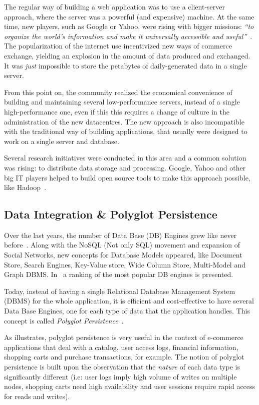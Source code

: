\documentclass{article}
\begin{document}
The regular way of building a web application was to use a client-server approach, where the server was a powerful (and expensive) machine. 
At the same time, new players, such as Google or Yahoo, were rising with bigger missions: \textit{``to organize the world's information and make it universally accessible and useful''}~\cite{Spector:2012:GHA:2209249.2209262}. 
The popularization of the internet use incentivized new ways of commerce exchange, yielding an explosion in the amount of data produced and exchanged. 
It was \textit{just} impossible to store the petabytes of daily-generated data in a single server. 

From this point on, the community realized the economical convenience of building and maintaining several low-performance servers, instead of a single high-performance one, even if this this requires a change of culture in the administration of the new datacentres.
The new approach is also incompatible with the traditional way of building applications, that usually were designed to work on a single server and database. 

Several research initiatives were conducted in this area and a common solution was rising: to distribute data storage and processing. 
Google, Yahoo and other big IT players helped to build open source tools to make this approach possible, like Hadoop~\cite{5496972}.


\subsection{Data Integration \& Polyglot Persistence}
Over the last years, the number of Data Base (DB) Engines grew like never before~\cite{dbranking}. 
Along with the NoSQL (Not only SQL) movement and expansion of Social Networks, new concepts for Database Models appeared, like Document Store, Search Engines, Key-Value store, Wide Column Store, Multi-Model and Graph DBMS. 
In~\cite{dbranking} a ranking of the most popular DB engines is presented.

Today, instead of having a single Relational Database Management System (DBMS) for the whole application, it is efficient and cost-effective to have several Data Base Engines, one for each type of data that the application handles. 
This concept is called \textit{Polyglot Persistence}~\cite{sadalage2012nosql}.

As \cite{AdressingDataManagementCloud} illustrates, polyglot persistence is very useful in the context of  e-commerce applications that deal with a catalog, user access logs, financial information, shopping carts and purchase transactions, for example.
The notion of polyglot persistence is built upon the observation that the \textit{nature} of each data type is significantly different (i.e: user logs imply high volume of writes on multiple nodes, shopping carts need high availability and user sessions require rapid access for reads and writes). 
\end{document}

